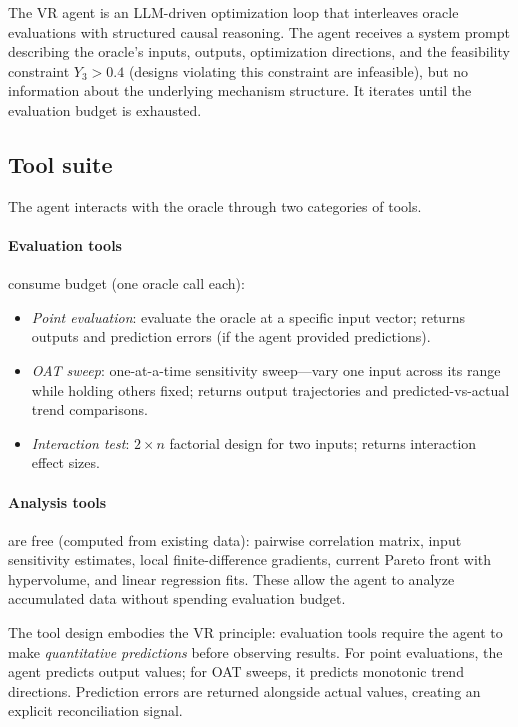 \documentclass[11pt,letterpaper]{article}
\begin{document}
The VR agent is an LLM-driven optimization loop
that interleaves oracle evaluations with structured causal reasoning. The
agent receives a system prompt describing the oracle's inputs, outputs,
optimization directions, and the feasibility constraint $Y_3 > 0.4$
(designs violating this constraint are infeasible), but no information
about the underlying mechanism structure. It iterates until
the evaluation budget is exhausted.

\subsection{Tool suite}

The agent interacts with the oracle through two categories of tools.

\paragraph{Evaluation tools} consume budget (one oracle call each):
\begin{itemize}
  \item \emph{Point evaluation}: evaluate the oracle at a specific input
  vector; returns outputs and prediction errors (if the agent provided
  predictions).
  \item \emph{OAT sweep}: one-at-a-time sensitivity sweep---vary one
  input across its range while holding others fixed; returns output
  trajectories and predicted-vs-actual trend comparisons.
  \item \emph{Interaction test}: $2 \times n$ factorial design for two
  inputs; returns interaction effect sizes.
\end{itemize}

\paragraph{Analysis tools} are free (computed from existing data):
pairwise correlation matrix, input sensitivity estimates, local
finite-difference gradients, current Pareto front with hypervolume, and
linear regression fits. These allow the agent to analyze accumulated
data without spending evaluation budget.

The tool design embodies the VR principle: evaluation tools require the
agent to make \emph{quantitative predictions} before observing results.
For point evaluations, the agent predicts output values; for OAT
sweeps, it predicts monotonic trend directions. Prediction
errors are returned alongside actual values, creating an explicit
reconciliation signal.
\end{document}
